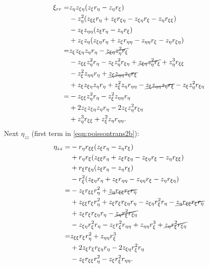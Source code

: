 \begin{equation}
\begin{aligned}
		\xi_{rr} =& z_\eta z_{\xi\eta}(z_\xi r_\eta - z_\eta r_\xi) \\
		&- z_\eta^2 (z_{\xi\xi} r_\eta + z_\xi r_{\xi\eta} - z_{\xi\eta} r_\xi - z_\eta r_{\xi\xi}) \\
		&-  z_\xi z_{\eta\eta}(z_\xi r_\eta - z_\eta r_\xi) \\
		&+ z_\xi z_\eta ( z_{\xi\eta} r_\eta + z_\xi r_{\eta\eta} - z_{\eta\eta} r_\xi - z_\eta r_{\xi\eta})\\
		=& z_\xi z_{\xi\eta} z_\eta  r_\eta -  \cancel{z_{\xi\eta} z_\eta^2 r_\xi} \\
		&- z_{\xi\xi} z_\eta^2  r_\eta - z_\xi z_\eta^2 r_{\xi\eta} + \cancel{z_{\xi\eta} z_\eta^2 r_\xi} + z_\eta^3 r_{\xi\xi} \\
		&- z_\xi^2 z_{\eta\eta} r_\eta + \cancel{z_\xi z_{\eta\eta} z_\eta r_\xi} \\
		&+ z_\xi z_{\xi\eta} z_\eta  r_\eta + z_\xi^2 z_\eta r_{\eta\eta} -  \cancel{z_\xi z_{\eta\eta} z_\eta r_\xi} - z_\xi z_\eta^2 r_{\xi\eta}\\
		=& - z_{\xi\xi} z_\eta^2  r_\eta - z_\xi^2 z_{\eta\eta} r_\eta  \\
		&+ 2z_\xi z_{\xi\eta} z_\eta  r_\eta - 2z_\xi z_\eta^2 r_{\xi\eta} \\
		&+ z_\eta^3 r_{\xi\xi} + z_\xi^2 z_\eta r_{\eta\eta}.
\end{aligned}
\end{equation}
%
Next \(\eta_{zz}\) (first term in \cref{eqn:poissontrans2b}):
%
\begin{equation}
\begin{aligned}
		\eta_{zz} =& -r_\eta r_{\xi\xi}(z_\xi r_\eta - z_\eta r_\xi) \\
		&+ r_\eta r_\xi (z_{\xi\xi} r_\eta + z_\xi r_{\xi\eta} - z_{\xi\eta} r_\xi - z_\eta r_{\xi\xi}) \\
		&+ r_\xi r_{\xi\eta}(z_\xi r_\eta - z_\eta r_\xi) \\
		&- r_\xi^2 (z_{\xi\eta} r_\eta + z_\xi r_{\eta\eta} - z_{\eta\eta} r_\xi - z_\eta r_{\xi\eta})\\
		=& - z_\xi r_{\xi\xi} r_\eta^2 + \cancel{z_\eta r_{\xi\xi} r_\xi r_\eta}  \\
		&+ z_{\xi\xi} r_\xi r_\eta^2 + z_\xi  r_\xi  r_{\xi\eta} r_\eta - z_{\xi\eta} r_\xi^2 r_\eta  - \cancel{z_\eta r_{\xi\xi} r_\xi r_\eta}  \\
		&+ z_\xi r_\xi r_{\xi\eta}  r_\eta - \cancel{z_\eta r_\xi^2  r_{\xi\eta}} \\
		&- z_{\xi\eta} r_\xi^2  r_\eta - z_\xi r_\xi^2  r_{\eta\eta} + z_{\eta\eta} r_\xi^3 + \cancel{z_\eta r_\xi^2  r_{\xi\eta}}\\
		=& z_{\xi\xi} r_\xi r_\eta^2  + z_{\eta\eta} r_\xi^3\\
		& + 2z_\xi  r_\xi  r_{\xi\eta} r_\eta - 2z_{\xi\eta} r_\xi^2 r_\eta   \\
		& - z_\xi r_{\xi\xi} r_\eta^2 - z_\xi r_\xi^2  r_{\eta\eta}.
\end{aligned}
\end{equation}
